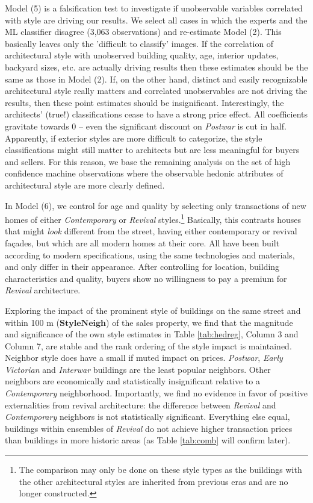\documentclass[]{article}
\begin{document}
Model (5) is a falsification test to investigate if unobservable variables correlated with style are driving our results. We select all cases in which the experts and the ML classifier disagree (3,063 observations) and re-estimate Model (2). This basically leaves only the 'difficult to classify' images. If the correlation of architectural style with unobserved building quality, age, interior updates, backyard sizes, etc. are actually driving results then these estimates should be the same as those in Model (2). If, on the other hand, distinct and easily recognizable architectural style really matters and correlated unobservables are not driving the results, then these point estimates should be insignificant. Interestingly, the architects' (true!) classifications cease to have a strong price effect. All coefficients gravitate towards 0 -- even the significant discount on \emph{Postwar} is cut in half. Apparently, if exterior styles are more difficult to categorize, the style classifications might still matter to architects but are less meaningful for buyers and sellers. For this reason, we base the remaining analysis on the set of high confidence machine observations where the observable hedonic attributes of architectural style are more clearly defined.

In Model (6), we control for age and quality by selecting only transactions of new homes of either \emph{Contemporary} or \emph{Revival} styles.\footnote{The comparison may only be done on these style types as the buildings with the other architectural styles are inherited from previous eras and are no longer constructed.}  Basically, this contrasts houses that might \emph{look} different from the street, having either contemporary or revival façades, but which are all modern homes at their core. All have been built according to modern specifications, using the same technologies and materials, and only differ in their appearance. After controlling for location, building characteristics and quality, buyers show no willingness to pay a premium for \emph{Revival} architecture. 

Exploring the impact of the prominent style of buildings on the same street and within 100 m (\(\mathbf{StyleNeigh}\)) of the sales property, we find that the magnitude and significance of the own style estimates in Table \ref{tab:hedreg}, Column 3 and Column 7, are stable and the rank ordering of the style impact is maintained. Neighbor style does have a small if muted impact on prices. \emph{Postwar}, \emph{Early Victorian} and \emph{Interwar} buildings are the least popular neighbors. Other neighbors are economically and statistically insignificant relative to a \emph{Contemporary} neighborhood. Importantly, we find no evidence in favor of positive externalities from revival architecture: the difference between \emph{Revival} and \emph{Contemporary} neighbors is not statistically significant. Everything else equal, buildings within ensembles of \emph{Revival} do not
achieve higher transaction prices than buildings in more historic areas
(as Table \ref{tab:comb} will confirm later).
\end{document}
